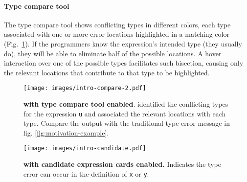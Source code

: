

\paragraph{Type compare tool} \label{sub:type-compare}

The type compare tool shows conflicting types in different colors, each type associated with one or more error locations highlighted in a matching color (Fig.~\ref{fig:compare}).  
If the programmers know the expression's intended type (they usually do), they will be able to eliminate half of the possible locations. 
A hover interaction over one of the possible types facilitates such bisection, causing only the relevant locations that contribute to that type to be highlighted. 


\begin{figure}[ht]
    \centering
    \texttt{[image: images/intro-compare-2.pdf]}
    \caption[\chameleon{} with type compare tool enabled]{
        \textbf{\chameleon{} with type compare tool enabled}. \chameleon{} identified the conflicting types for the expression \texttt{u} and associated the relevant locations with each type. Compare the output with the traditional type error message in fig. \ref{fig:motivation-example}.
}
    \label{fig:compare}
\end{figure}

\begin{figure}[ht]
    \centering
    \texttt{[image: images/intro-candidate.pdf]}
    \caption[\chameleon{} with candidate expression cards enabled.]{
        \textbf{\chameleon{} with candidate expression cards enabled.}
        Indicates the type error can occur in the definition of \texttt{x} or \texttt{y}.
    }
    \label{fig:expression}
\end{figure}


